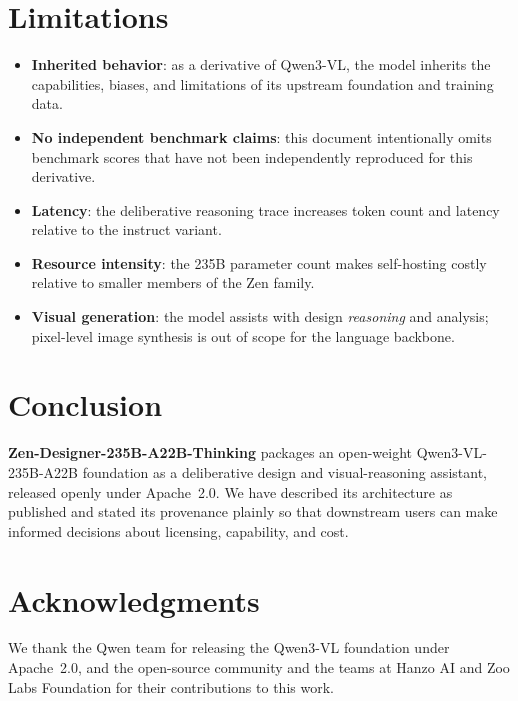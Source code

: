 \documentclass[11pt,a4paper]{article}
\begin{document}
\section{Limitations}

\begin{itemize}
    \item \textbf{Inherited behavior}: as a derivative of Qwen3-VL, the model inherits the
          capabilities, biases, and limitations of its upstream foundation and training data.
    \item \textbf{No independent benchmark claims}: this document intentionally omits benchmark
          scores that have not been independently reproduced for this derivative.
    \item \textbf{Latency}: the deliberative reasoning trace increases token count and latency
          relative to the instruct variant.
    \item \textbf{Resource intensity}: the 235B parameter count makes self-hosting costly
          relative to smaller members of the Zen family.
    \item \textbf{Visual generation}: the model assists with design \emph{reasoning} and
          analysis; pixel-level image synthesis is out of scope for the language backbone.
\end{itemize}

\section{Conclusion}

\textbf{Zen-Designer-235B-A22B-Thinking} packages an open-weight Qwen3-VL-235B-A22B foundation as
a deliberative design and visual-reasoning assistant, released openly under Apache~2.0. We have
described its architecture as published and stated its provenance plainly so that downstream
users can make informed decisions about licensing, capability, and cost.

\section*{Acknowledgments}

We thank the Qwen team for releasing the Qwen3-VL foundation under Apache~2.0, and the
open-source community and the teams at Hanzo AI and Zoo Labs Foundation for their contributions
to this work.
\end{document}
